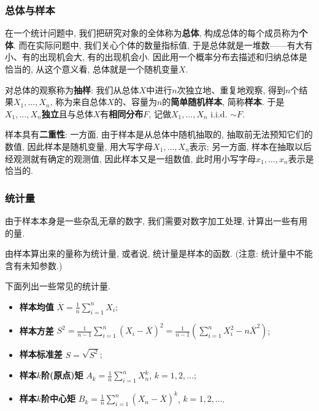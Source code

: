 \documentclass[11pt]{ctexart}
\begin{document}
\subsubsection{总体与样本}

在一个统计问题中, 我们把研究对象的全体称为\textbf{总体}, 构成总体的每个成员称为\textbf{个体}. 
而在实际问题中, 我们关心个体的数量指标值, 于是总体就是一堆数——有大有小、有的出现机会大, 有的出现机会小. 
因此用一个概率分布去描述和归纳总体是恰当的, 从这个意义看, 总体就是一个随机变量$X$. 

对总体的观察称为\textbf{抽样}: 我们从总体$X$中进行$n$次独立地、重复地观察, 得到$n$个结果$X_1, \dots, X_n$, 称为来自总体$X$的、容量为$n$的\textbf{简单随机样本}, 简称\textbf{样本}.
于是$X_1, \dots, X_n$\textbf{独立}且与总体$X$有\textbf{相同分布}$F$, 记做$X_1, \dots, X_n$ i.i.d. $\sim F$. 

样本具有\textbf{二重性}: 一方面, 由于样本是从总体中随机抽取的, 抽取前无法预知它们的数值, 因此样本是随机变量, 用大写字母$X_1, \dots, X_n$表示; 另一方面, 样本在抽取以后经观测就有确定的观测值, 因此样本又是一组数值, 此时用小写字母$x_1, \dots, x_n$表示是恰当的.

\subsubsection{统计量}

由于样本本身是一些杂乱无章的数字, 我们需要对数字加工处理, 计算出一些有用的量. 
\begin{definition}[统计量]
	由样本算出来的量称为统计量, 或者说, 统计量是样本的函数. (注意: 统计量中不能含有未知参数.)
\end{definition}
下面列出一些常见的统计量. 
\begin{itemize}
	\item \textbf{样本均值} $\displaystyle \overline{X} = \frac{1}{n} \sum_{i=1}^n X_i$; 
	\item \textbf{样本方差} $\displaystyle S^2 = \frac{1}{n-1} \sum_{i=1}^n (X_i - \overline{X})^2 = \frac{1}{n-1} \left( \sum_{i=1}^n X_i^2 - n  \overline{X}^2 \right)$; 
	\item \textbf{样本标准差} $\displaystyle S = \sqrt{S^2}$; 
	\item \textbf{样本$k$阶(原点)矩} $\displaystyle A_k = \frac{1}{n} \sum_{i=1}^n X_n^k$, $k = 1, 2, \dots$; 
	\item \textbf{样本$k$阶中心矩} $\displaystyle B_k = \frac{1}{n} \sum_{i=1}^n (X_n - \overline{X})^k$, $k = 1, 2, \dots$. 
\end{itemize} 
\end{document}
